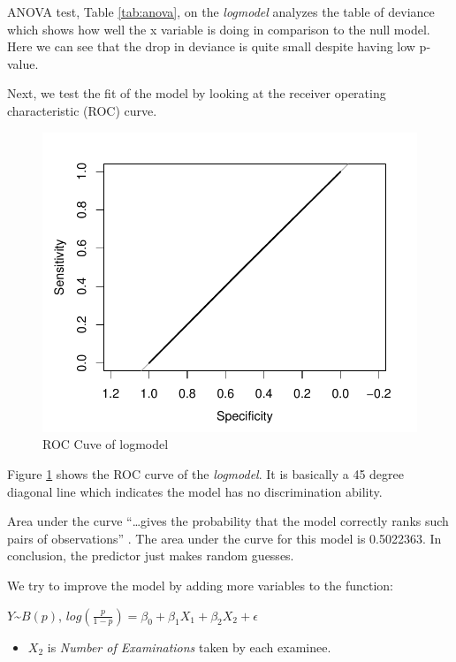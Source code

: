 \documentclass[11pt,a4paper,]{article}
\providecommand{\tightlist}{%
  \setlength{\itemsep}{0pt}\setlength{\parskip}{0pt}}
\begin{document}
ANOVA test, Table \ref{tab:anova}, on the \emph{logmodel} analyzes the table of deviance which shows how well the x variable is doing in comparison to the null model. Here we can see that the drop in deviance is quite small despite having low p-value.

Next, we test the fit of the model by looking at the receiver operating characteristic (ROC) curve.

\begin{figure}
\centering
\includegraphics{Assignment4_files/figure-latex/roc-1.pdf}
\caption{\label{fig:roc}ROC Cuve of logmodel}
\end{figure}

Figure \ref{fig:roc} shows the ROC curve of the \emph{logmodel}. It is basically a 45 degree diagonal line which indicates the model has no discrimination ability.

Area under the curve ``\ldots gives the probability that the model correctly ranks such pairs of observations'' \textcite{bartlett_2014}. The area under the curve for this model is 0.5022363. In conclusion, the predictor just makes random guesses.

We try to improve the model by adding more variables to the function:

\(Y\)\textasciitilde{}\(B(p)\), \(log(\frac{p}{1-p}) = \beta_0 +\beta_1 X_1 +\beta_2 X_2 + \epsilon\)

\begin{itemize}
\tightlist
\item
  \(X_2\) is \emph{Number of Examinations} taken by each examinee.
\end{itemize}
\end{document}
